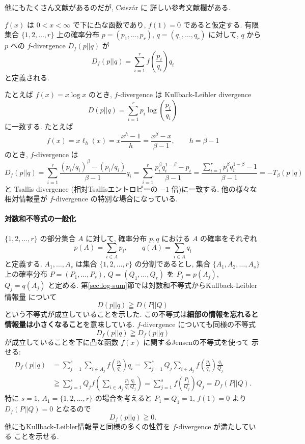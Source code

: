 \documentclass[12pt,twoside]{jarticle}
\theoremstyle{definition} %
\theoremstyle{definition} %
\theoremstyle{definition} %
\numberwithin{theorem}{section}
\numberwithin{equation}{section}
\numberwithin{figure}{section}
\numberwithin{table}{section}
\newcommand\secref[1]{第\ref{#1}節}
\begin{document}
他にもたくさん文献があるのだが, Csisz\'ar \cite{Csiszar2008} に
詳しい参考文献欄がある.

$f(x)$ は $0<x<\infty$ で下に凸な函数であり, $f(1)=0$ であると仮定する.
有限集合 $\{1,2,\ldots,r\}$ 上の確率分布 $p=(p_1,\ldots,p_r)$,
$q=(q_1,\ldots,q_r)$ に対して, $q$ から $p$ への $f$-divergence $D_f(p||q)$ が
\[
D_f(p||q)=\sum_{i=1}^r f\left(\frac{p_i}{q_i}\right)q_i
\]
と定義される. 

たとえば $f(x)=x\log x$ のとき, $f$-divergence は Kullback-Leibler divergence
\[
D(p||q)=\sum_{i=1}^r p_i\log\left(\frac{p_i}{q_i}\right)
\]
に一致する. たとえば
\[
f(x)=x\ell_h(x)=x\frac{x^h-1}{h}=\frac{x^\beta-x}{\beta-1},
\qquad h=\beta-1
\]
のとき, $f$-divergence は
\[
D_f(p||q)
=\sum_{i=1}^r\frac{(p_i/q_i)^\beta-(p_i/q_i)}{\beta-1}q_i
=\sum_{i=1}^r\frac{p_i^\beta q_i^{1-\beta}-p_i}{\beta-1}
=\frac{\sum_{i=1}^r p_i^\beta q_i^{1-\beta}-1}{\beta-1}
=-T_\beta(p||q)
\]
と Tsallis divergence (相対Tsallisエントロピーの $-1$ 倍)に一致する.
他の様々な相対情報量が $f$-divergence の特別な場合になっている.

\paragraph{対数和不等式の一般化}
$\{1,2,\ldots,r\}$ の部分集合 $A$ に対して, 
確率分布 $p,q$ における $A$ の確率をそれぞれ
\[
p(A) = \sum_{i\in A} p_i, \qquad
q(A) = \sum_{i\in A} q_i
\]
と定義する. $A_1,\ldots,A_s$ は集合 $\{1,2,\ldots,r\}$ の分割であるとし, 
集合 $\{A_1,A_2,\ldots,A_s\}$ 上の確率分布
$P=(P_1,\ldots,P_s)$, $Q=(Q_1,\ldots,Q_r)$ を $P_j=p(A_j)$, $Q_j=q(A_j)$ 
と定める. \secref{sec:log-sum}では対数和不等式からKullback-Leibler情報量
について
\[
D(p||q)\geqq D(P||Q)
\]
という不等式が成立していることを示した. 
この不等式は{\bf 細部の情報を忘れると情報量は小さくなること}を意味している.
$f$-divergence についても同様の不等式
\[
D_f(p||q)\geqq D_f(p||q)
\]
が成立していることを下に凸な函数 $f(x)$ に関するJensenの不等式を使って
示せる:
\begin{align*}
D_f(p||q)
&
=\sum_{j=1}^s\sum_{i\in A_j} f\left(\frac{p_i}{q_i}\right)q_i
=\sum_{j=1}^s Q_j \sum_{i\in A_j} f\left(\frac{p_i}{q_i}\right)\frac{q_i}{Q_j}
\\ &
\geqq\sum_{j=1}^s Q_j f\left(\sum_{i\in A_j}\frac{p_i}{q_i}\frac{q_i}{Q_j}\right)
=\sum_{j=1}^s f\left(\frac{P_j}{Q_j}\right)Q_j
=D_f(P||Q).
\end{align*}
特に $s=1$, $A_1=\{1,2,\ldots,r\}$ の場合を考えると $P_1=Q_1=1$, $f(1)=0$
より $D_f(P||Q)=0$ となるので
\[
D_f(p||q)\geqq 0.
\]
他にもKullback-Leibler情報量と同様の多くの性質を $f$-divergence が満たしている
ことを示せる.
\end{document}
